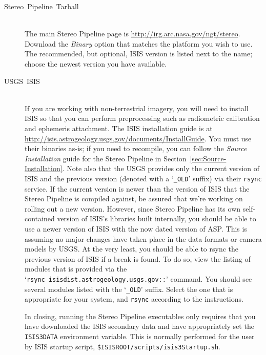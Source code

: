 \begin{description}
\item [{Stereo~Pipeline~Tarball}] \hspace*{\fill} \\
The main Stereo Pipeline page is
\url{http://irg.arc.nasa.gov/ngt/stereo}.  Download the \emph{Binary}
option that matches the platform you wish to use. The recommended, but
optional, \ac{ISIS} version is listed next to the name; choose the
newest version you have available.

\item [{USGS~ISIS}] \hspace*{\fill} \\
If you are working with non-terrestrial imagery, you will need to install
\ac{ISIS} so that you can perform preprocessing such as radiometric
calibration and ephemeris attachment. The \ac{ISIS} installation guide is at
\url{http://isis.astrogeology.usgs.gov/documents/InstallGuide}.  You
must use their binaries as-is; if you need to recompile, you can
follow the \emph{Source Installation} guide for the Stereo Pipeline in
Section~\ref{sec:Source-Installation}.  Note also that the \ac{USGS}
provides only the current version of \ac{ISIS} and the previous
version (denoted with a `\texttt{\_OLD}' suffix) via their
\texttt{rsync} service. If the current version is newer than the
version of ISIS that the Stereo Pipeline is compiled against, be
assured that we're working on rolling out a new version. However,
since Stereo Pipeline has its own self-contained version of ISIS's
libraries built internally, you should be able to use a newer version
of ISIS with the now dated version of \ac{ASP}. This is assuming no major
changes have taken place in the data formats or camera models by
\ac{USGS}. At the very least, you should be able to rsync the previous
version of ISIS if a break is found.  To do so, view the listing of
modules that is provided via the
`\texttt{rsync~isisdist.astrogeology.usgs.gov::}' command.  You should
see several modules listed with the `\texttt{\_OLD}' suffix.  Select
the one that is appropriate for your system, and \texttt{rsync}
according to the instructions.

In closing, running the Stereo Pipeline executables only requires that
you have downloaded the ISIS secondary data and have appropriately set
the \texttt{ISIS3DATA} environment variable. This is normally
performed for the user by ISIS startup script,
\texttt{\$ISISROOT/scripts/isis3Startup.sh}.

\end{description}

